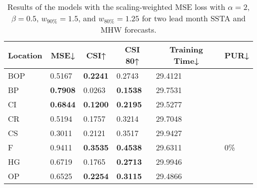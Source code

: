 \documentclass[11pt, a4paper]{article}
\begin{document}
\begin{table}[H]
\centering
\small
\caption{Results of the models with the scaling-weighted MSE loss with $\alpha=2$, $\beta=0.5$, $w_{90\%}=1.5$, and $w_{80\%}=1.25$ for two lead month SSTA and MHW forecasts.}
\begin{tabular}{llllll}
\multicolumn{1}{c}{\textbf{Location}} & \multicolumn{1}{c}{\textbf{MSE↓}} & \multicolumn{1}{c}{\textbf{CSI↑}} & \multicolumn{1}{c}{\textbf{CSI 80↑}} & \multicolumn{1}{c}{\textbf{Training Time↓}} & \multicolumn{1}{c}{\textbf{PUR↓}} \\ \hline
BOP                         & 0.5167                            & \textbf{0.2241}                   & 0.2743                               & 29.4121                                     &                                   \\
BP                        & \textbf{0.7908}                   & 0.0263                            & \textbf{0.1538}                      & 29.7531                                     &                                   \\
CI                        & \textbf{0.6844}                   & \textbf{0.1200}                   & \textbf{0.2195}                      & 29.5277                                     &                                   \\
CR                           & 0.5194                            & 0.1757                            & 0.3214                               & 29.7048                                     &                                   \\
CS                           & 0.3011                            & 0.2121                            & 0.3517                               & 29.9427                                     &                                   \\
F                             & 0.9411                            & \textbf{0.3535}                   & \textbf{0.4538}                      & 29.6311                                     & 0\%                               \\
HG                          & 0.6719                            & 0.1765                            & \textbf{0.2713}                      & 29.9946                                     &                                   \\
OP                       & 0.6525                            & \textbf{0.2254}                   & \textbf{0.3115}                      & 29.4866                                     &                                   \\

\end{tabular}
\end{table}
\end{document}
